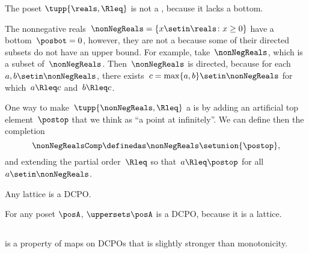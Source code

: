 \begin{example}
    \label{exa:Rcomp}
    The poset $\tupp{\reals, \Rleq}$ is not a \CPO, because it lacks a bottom.

    The nonnegative reals~$\nonNegReals=\{x\setin\reals \colon x\geq0\}$ have a bottom~$\posbot=0$, however, they are not a \DCPO because some of their directed subsets do not have an upper bound.
    For example, take~$\nonNegReals$, which is a subset of~$\nonNegReals$.
    Then~$\nonNegReals$ is directed, because for each~$a,b\setin\nonNegReals$, there exists~$c=\max\{a,b\}\setin\nonNegReals$ for which~$a\Rleq c$ and~$b\Rleq c$.

    One way to make~$\tupp{ \nonNegReals,\Rleq} $ a \CPO is by adding an artificial top element~$\postop$ that we think as ``a point at infinitely''.
    We can define then the completion
    \begin{equation}
        \nonNegRealsComp\definedas\nonNegReals\setunion\{\postop\},
    \end{equation} and extending the partial order~$\Rleq$ so that~$a\Rleq\postop$ for all~$a\setin\nonNegReals$.
\end{example}

\begin{example}
    Any lattice is a DCPO.
\end{example}
\begin{example}
    For any poset $\posA$, $\uppersets \posA$ is a DCPO, because it is a lattice.
\end{example}
\subsection{\scottcontinuity}

\scottcontinuity is a property of maps on DCPOs that is slightly stronger than monotonicity.

